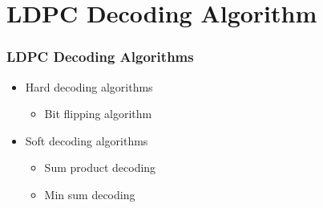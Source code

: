 \documentclass[xcolor=dvipsname]
{beamer}
\begin{document}
\section{LDPC Decoding Algorithm}


 \begin{frame}[t]
\frametitle{LDPC Decoding Algorithms}
\begin{itemize}
\item Hard decoding algorithms
	\begin{itemize}
	\item Bit flipping algorithm
	\end{itemize}
\item Soft decoding algorithms
	\begin{itemize}
	\item Sum product decoding
	\item Min sum decoding
	\end{itemize}
\end{itemize}
\end{frame}	


\end{document}
